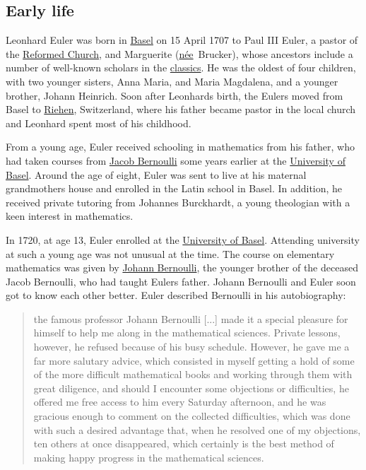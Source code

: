 \subsection{Early life}\label{Early_life}

Leonhard Euler was born in \href{https://en.wikipedia.org/wiki/Basel}{Basel} on 15 April 1707 to Paul III Euler, a pastor of the \href{https://en.wikipedia.org/wiki/Reformed_Church}{Reformed Church}, and Marguerite ({\href{https://en.wikipedia.org/wiki/Birth_name\#Maiden_and_married_names}{née}{~}Brucker}), whose ancestors include a number of well-known scholars in the \href{https://en.wikipedia.org/wiki/Classics}{classics}. He was the oldest of four children, with two younger sisters, Anna Maria, and Maria Magdalena, and a younger brother, Johann Heinrich. Soon after Leonhard\textquotesingle s birth, the Eulers moved from Basel to \href{https://en.wikipedia.org/wiki/Riehen}{Riehen}, Switzerland, where his father became pastor in the local church and Leonhard spent most of his childhood.

From a young age, Euler received schooling in mathematics from his father, who had taken courses from \href{https://en.wikipedia.org/wiki/Jacob_Bernoulli}{Jacob Bernoulli} some years earlier at the \href{https://en.wikipedia.org/wiki/University_of_Basel}{University of Basel}. Around the age of eight, Euler was sent to live at his maternal grandmother\textquotesingle s house and enrolled in the Latin school in Basel. In addition, he received private tutoring from Johannes Burckhardt, a young theologian with a keen interest in mathematics.

In 1720, at age 13, Euler enrolled at the \href{https://en.wikipedia.org/wiki/University_of_Basel}{University of Basel}. Attending university at such a young age was not unusual at the time. The course on elementary mathematics was given by \href{https://en.wikipedia.org/wiki/Johann_Bernoulli}{Johann Bernoulli}, the younger brother of the deceased Jacob Bernoulli, who had taught Euler\textquotesingle s father. Johann Bernoulli and Euler soon got to know each other better. Euler described Bernoulli in his autobiography:

\begin{quote}
the famous professor Johann Bernoulli {[}...{]} made it a special pleasure for himself to help me along in the mathematical sciences. Private lessons, however, he refused because of his busy schedule. However, he gave me a far more salutary advice, which consisted in myself getting a hold of some of the more difficult mathematical books and working through them with great diligence, and should I encounter some objections or difficulties, he offered me free access to him every Saturday afternoon, and he was gracious enough to comment on the collected difficulties, which was done with such a desired advantage that, when he resolved one of my objections, ten others at once disappeared, which certainly is the best method of making happy progress in the mathematical sciences.
\end{quote}

